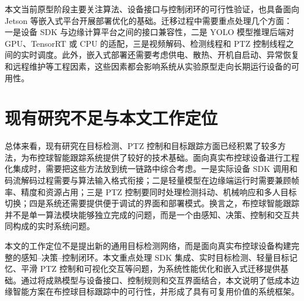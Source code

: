 本文当前原型阶段主要关注算法、设备接口与控制闭环的可行性验证，也具备面向 Jetson 等嵌入式平台开展部署优化的基础。迁移过程中需要重点处理几个方面：一是设备 SDK 与边缘计算平台之间的接口兼容性，二是 YOLO 模型推理后端对 GPU、TensorRT 或 CPU 的适配，三是视频解码、检测线程和 PTZ 控制线程之间的实时调度。此外，嵌入式部署还需要考虑供电、散热、开机自启动、异常恢复和远程维护等工程因素，这些因素都会影响系统从实验原型走向长期运行设备的可用性。

\section{现有研究不足与本文工作定位}

总体来看，现有研究在目标检测、PTZ 控制和目标跟踪方面已经积累了较多方法，为布控球智能跟踪系统提供了较好的技术基础。面向真实布控球设备进行工程化集成时，需要把这些方法放到统一链路中综合考虑。一是实际设备 SDK 调用和码流解码过程需要与算法输入格式衔接；二是轻量模型在边缘端运行时需要兼顾帧率、精度和资源占用；三是 PTZ 控制要同时处理检测抖动、机械响应和多人目标切换；四是系统还需要提供便于调试的界面和部署模式。换言之，布控球智能跟踪并不是单一算法模块能够独立完成的问题，而是一个由感知、决策、控制和交互共同构成的实时系统问题。

本文的工作定位不是提出新的通用目标检测网络，而是面向真实布控球设备构建完整的感知--决策--控制闭环。本文重点处理 SDK 集成、实时目标检测、轻量目标记忆、平滑 PTZ 控制和可视化交互等问题，为系统性能优化和嵌入式迁移提供基础。通过将成熟模型与设备接口、控制规则和交互界面结合，本文说明了低成本边缘智能方案在布控球目标跟踪中的可行性，并形成了具有可复用价值的系统框架。
